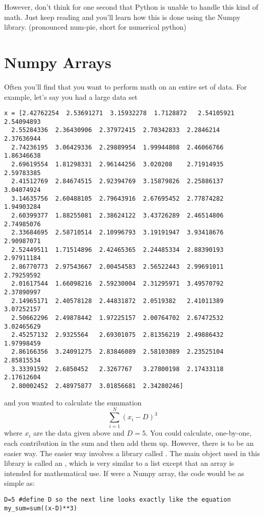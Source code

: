However, don't think for one second that Python is unable
to handle this kind of math.  Just keep reading and you'll learn how
this is done using the Numpy library. (pronounced num-pie, short for numerical
python)


\section{Numpy Arrays}
Often you'll find that you want to perform math on an entire set of
data.  For example, let's say you had a large data set
\begin{Verbatim}
x = [2.42762254  2.53691271  3.15932278  1.7128872   2.54105921  2.54094893
  2.55284336  2.36430906  2.37972415  2.70342833  2.2846214   2.37636944
  2.74236195  3.06429336  2.29889954  1.99944808  2.46066766  1.86346638
  2.69619554  1.81298331  2.96144256  3.020208    2.71914935  2.59783385
  2.41512769  2.84674515  2.92394769  3.15879826  2.25886137  3.04074924
  3.14635756  2.60488105  2.79643916  2.67695452  2.77874282  1.94903284
  2.60399377  1.88255081  2.38624122  3.43726289  2.46514806  2.74985076
  2.33684695  2.58710514  2.10996793  3.19191947  3.93418676  2.90987071
  2.52449511  1.71514896  2.42465365  2.24485334  2.88390193  2.97911184
  2.86770773  2.97543667  2.00454583  2.56522443  2.99691011  2.79259592
  2.01617544  1.66098216  2.59230004  2.31295971  3.49570792  2.37890997
  2.14965171  2.40578128  2.44831872  2.0519382   2.41011389  3.07252157
  2.50662296  2.49878442  1.97225157  2.00764702  2.67472532  3.02465629
  2.45257132  2.9325564   2.69301075  2.81356219  2.49886432  1.97998459
  2.86166356  3.24091275  2.83846089  2.58103089  2.23525104  2.85815534
  3.33391592  2.6850452   2.3267767   3.27800198  2.17433118  2.17612604
  2.80002452  2.48975877  3.01856681  2.34280246]
\end{Verbatim}
and you wanted to calculate the summation
\begin{equation}\label{eq:sum}
\sum_{i=1}^N (x_i - D)^3
\end{equation}
where $x_i$ are the data given above and $D = 5$.  You could
calculate, one-by-one, each contribution in the sum and then add them
up.
However, there is to be an easier way.  The easier way involves a
library called  .  The main object used in this library is called an
, which is very similar to a list except that an array
is intended for mathematical use.  If  were a Numpy array, the code would be as simple as:
\begin{Verbatim}
D=5 #define D so the next line looks exactly like the equation
my_sum=sum((x-D)**3)
\end{Verbatim}

